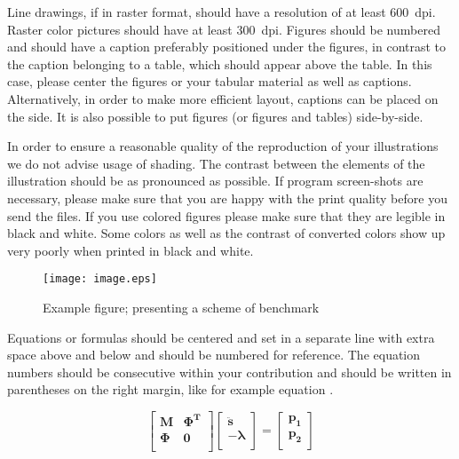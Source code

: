 \documentclass{mbd_fullpaper}
\begin{document}
Line drawings, if in raster format, should have a resolution of at least 600~dpi. Raster color pictures should have at least 300~dpi. Figures should be numbered and should have a caption preferably positioned under the figures, in contrast to the caption belonging to a table, which should appear above the table. In this case, please center the figures or your tabular material as well as captions. Alternatively, in order to make more efficient layout, captions can be placed on the side. It is also possible to put figures (or figures and tables) side-by-side.

In order to ensure a reasonable quality of the reproduction of your illustrations we do not advise usage of shading. The contrast between the elements of the illustration should be as pronounced as possible. If program screen-shots are necessary, please make sure that you are happy with the print quality before you send the files. If you use colored figures please make sure that they are legible in black and white. Some colors as well as the contrast of converted colors show up very poorly when printed in black and white.


\begin{figure}[ht]
  \begin{center}
    \texttt{[image: image.eps]}
    \caption{Example figure; presenting a scheme of benchmark \cite{Author2016}}
    \label{fig:fig1}
  \end{center}
\end{figure}


Equations or formulas should be centered and set in a separate line with extra space above and below and should be numbered for reference. The equation numbers should be consecutive within your contribution and should be written in parentheses on the right margin, like for example equation .

\begin{equation}
  \left [
  \begin{array}{cc}
    \boldsymbol{M}& \boldsymbol{\Phi^T}\\
    \boldsymbol{\Phi}& \boldsymbol{0}\\
  \end{array}
  \right ]
  \left [
  \begin{array}{c}
    \bm{\ddot s}\\
    -\boldsymbol{\lambda}\\
  \end{array}
  \right ]
  =
  \left [
  \begin{array}{c}
    \boldsymbol{p_1}\\
    \boldsymbol{p_2}\\
  \end{array}
  \right ]
  \label{eqn1}
\end{equation}
\end{document}
